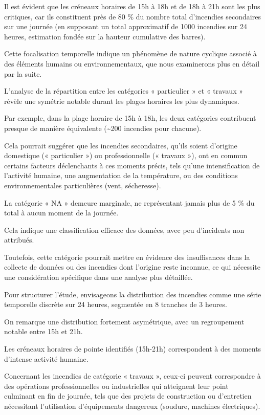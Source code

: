 \documentclass[
]{article}
\begin{document}
Il est évident que les créneaux horaires de 15h à 18h et de 18h à 21h
sont les plus critiques, car ils constituent près de 80 \% du nombre
total d'incendies secondaires sur une journée (en supposant un total
approximatif de 1000 incendies sur 24 heures, estimation fondée sur la
hauteur cumulative des barres).

Cette focalisation temporelle indique un phénomène de nature cyclique
associé à des éléments humains ou environnementaux, que nous examinerons
plus en détail par la suite.

L'analyse de la répartition entre les catégories « particulier » et «
travaux » révèle une symétrie notable durant les plages horaires les
plus dynamiques.

Par exemple, dans la plage horaire de 15h à 18h, les deux catégories
contribuent presque de manière équivalente (\textasciitilde200 incendies
pour chacune).

Cela pourrait suggérer que les incendies secondaires, qu'ils soient
d'origine domestique (« particulier ») ou professionnelle (« travaux »),
ont en commun certains facteurs déclenchants à ces moments précis, tels
qu'une intensification de l'activité humaine, une augmentation de la
température, ou des conditions environnementales particulières (vent,
sécheresse).

La catégorie « NA » demeure marginale, ne représentant jamais plus de 5
\% du total à aucun moment de la journée.

Cela indique une classification efficace des données, avec peu
d'incidents non attribués.

Toutefois, cette catégorie pourrait mettre en évidence des insuffisances
dans la collecte de données ou des incendies dont l'origine reste
inconnue, ce qui nécessite une considération spécifique dans une analyse
plus détaillée.

Pour structurer l'étude, envisageons la distribution des incendies comme
une série temporelle discrète sur 24 heures, segmentée en 8 tranches de
3 heures.

On remarque une distribution fortement asymétrique, avec un regroupement
notable entre 15h et 21h.

Les créneaux horaires de pointe identifiés (15h-21h) correspondent à des
moments d'intense activité humaine.

Concernant les incendies de catégorie « travaux », ceux-ci peuvent
correspondre à des opérations professionnelles ou industrielles qui
atteignent leur point culminant en fin de journée, tels que des projets
de construction ou d'entretien nécessitant l'utilisation d'équipements
dangereux (soudure, machines électriques).
\end{document}
